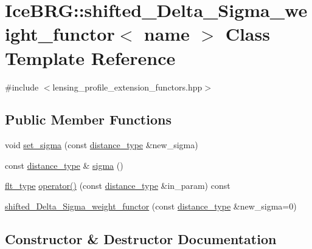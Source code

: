 \hypertarget{classIceBRG_1_1shifted__Delta__Sigma__weight__functor}{}\section{Ice\+B\+R\+G\+:\+:shifted\+\_\+\+Delta\+\_\+\+Sigma\+\_\+weight\+\_\+functor$<$ name $>$ Class Template Reference}
\label{classIceBRG_1_1shifted__Delta__Sigma__weight__functor}


{\ttfamily \#include $<$lensing\+\_\+profile\+\_\+extension\+\_\+functors.\+hpp$>$}

\subsection*{Public Member Functions}
\begin{DoxyCompactItemize}
\item 
void \hyperlink{classIceBRG_1_1shifted__Delta__Sigma__weight__functor_a2026781ba59225ada097ebbfe0bd6a2e}{set\+\_\+sigma} (const \hyperlink{namespaceIceBRG_a45499647eb87e24c10ab32c628711cec}{distance\+\_\+type} \&new\+\_\+sigma)
\item 
const \hyperlink{namespaceIceBRG_a45499647eb87e24c10ab32c628711cec}{distance\+\_\+type} \& \hyperlink{classIceBRG_1_1shifted__Delta__Sigma__weight__functor_a5cfdb023c662a6a36eb71f48d145af20}{sigma} ()
\item 
\hyperlink{lib_2IceBRG__main_2common_8h_ad0f130a56eeb944d9ef2692ee881ecc4}{flt\+\_\+type} \hyperlink{classIceBRG_1_1shifted__Delta__Sigma__weight__functor_a94c86fb0144b5d0b8141432ead2ae033}{operator()} (const \hyperlink{namespaceIceBRG_a45499647eb87e24c10ab32c628711cec}{distance\+\_\+type} \&in\+\_\+param) const 
\item 
\hyperlink{classIceBRG_1_1shifted__Delta__Sigma__weight__functor_a51a1dc51c719c6e056d489b57807b8a8}{shifted\+\_\+\+Delta\+\_\+\+Sigma\+\_\+weight\+\_\+functor} (const \hyperlink{namespaceIceBRG_a45499647eb87e24c10ab32c628711cec}{distance\+\_\+type} \&new\+\_\+sigma=0)
\end{DoxyCompactItemize}


\subsection{Constructor \& Destructor Documentation}
\hypertarget{classIceBRG_1_1shifted__Delta__Sigma__weight__functor_a51a1dc51c719c6e056d489b57807b8a8}{}

